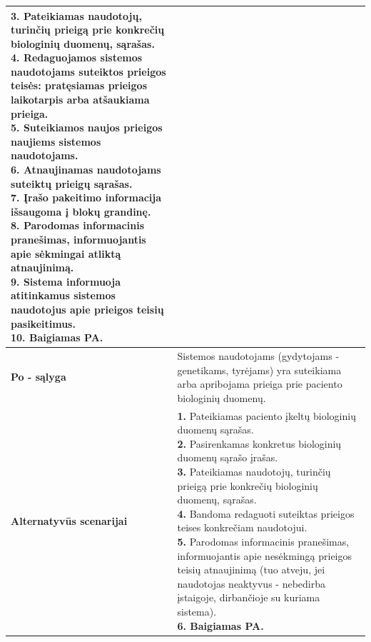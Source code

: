 \documentclass[12pt]{article}
\begin{document}
\begin{table}[htb!]
\begin{tabular}{|m{3cm}|m{13.7cm}|}
{{            \textbf{3.} {Pateikiamas naudotojų, turinčių prieigą prie konkrečių
            biologinių duomenų, sąrašas.} \\
            \textbf{4.} \textcolor{dartmouthgreen}{Redaguojamos sistemos
            naudotojams suteiktos prieigos teisės: pratęsiamas prieigos
            laikotarpis arba atšaukiama prieiga.} \\
            \textbf{5.} \textcolor{dartmouthgreen}{Suteikiamos naujos prieigos
            naujiems sistemos naudotojams.} \\
            \textbf{6.} {Atnaujinamas naudotojams suteiktų prieigų sąrašas.} \\
            \textbf{7.} {Įrašo pakeitimo informacija išsaugoma į blokų
            grandinę.} \\
            \textbf{8.} {Parodomas informacinis pranešimas, informuojantis apie
            sėkmingai atliktą atnaujinimą.} \\
            \textbf{9.} {Sistema informuoja atitinkamus sistemos naudotojus apie
            prieigos teisių pasikeitimus.} \\
            \textbf{10. Baigiamas PA.}
        }}
        \\
        \hline
        \raggedleft \textbf{\cellcolor{deepchampagne}Po - sąlyga} &
        Sistemos naudotojams (gydytojams - genetikams, tyrėjams) yra suteikiama
        arba apribojama prieiga prie paciento biologinių duomenų. \\
        \hline
        \raggedleft \textbf{\cellcolor{deepchampagne}Alternatyvūs scenarijai} &
        \vskip 5pt
        \makecell[l]{\parbox[t]{13.7cm}{
            \textbf{1.} {Pateikiamas paciento įkeltų biologinių duomenų
            sąrašas.} \\
            \textbf{2.} \textcolor{dartmouthgreen}{Pasirenkamas konkretus
            biologinių duomenų sąrašo įrašas.} \\
            \textbf{3.} {Pateikiamas naudotojų, turinčių prieigą prie konkrečių
            biologinių duomenų, sąrašas.} \\
            \textbf{4.} \textcolor{dartmouthgreen}{Bandoma redaguoti suteiktas
            prieigos teises konkrečiam naudotojui.} \\
            \textbf{5.} \textcolor{dartmouthgreen}{Parodomas informacinis
            pranešimas, informuojantis apie nesėkmingą prieigos teisių
            atnaujinimą (tuo atveju, jei naudotojas neaktyvus - nebedirba
            įstaigoje, dirbančioje su kuriama sistema).} \\
            \textbf{6. Baigiamas PA.}
        }}
        \\
        \hline
    \end{tabular}
\end{table}
\end{document}
